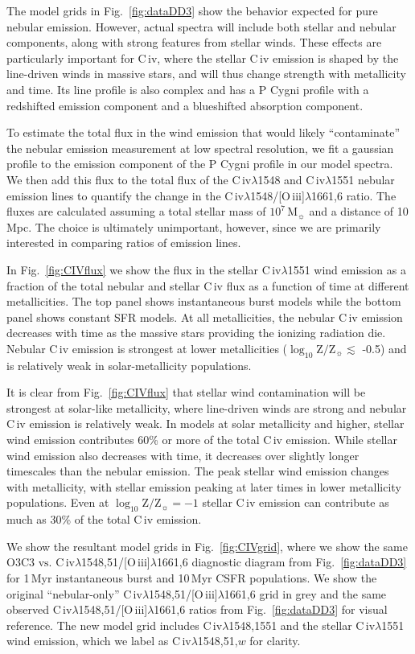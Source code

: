 \documentclass[preprint2,trackchanges]{aastex62}
\newcommand{\oiii}{[O\,{\sc iii}]\xspace}
\newcommand{\civ}{C\,{\sc iv}\xspace}
\newcommand\vs{\ensuremath{\mathrm{vs.}}\xspace}
\newcommand\Msun{\ensuremath{\mathrm{M_{\sun}}}\xspace}
\newcommand{\Myr}{$\,$Myr\xspace}
\newcommand{\logten}{\ensuremath{\log_{10}}}
\newcommand{\logz}{\ensuremath{\logten \mathrm{Z}/\mathrm{Z}_{\sun}}\xspace}
\newcommand{\logZeq}[1]{\ensuremath{\logten \mathrm{Z}/\mathrm{Z}_{\sun} = #1}}
\begin{document}
The model grids in Fig.~\ref{fig:dataDD3} show the behavior expected for pure nebular emission. However, actual spectra will include both stellar and nebular components, along with strong features from stellar winds. These effects are particularly important for \civ, where the stellar \civ emission is shaped by the line-driven winds in massive stars, and will thus change strength with metallicity and time. Its line profile is also complex and has a P Cygni profile with a redshifted emission component and a blueshifted absorption component.

To estimate the total flux in the wind emission that would likely ``contaminate'' the nebular emission measurement at low spectral resolution, we fit a gaussian profile to the emission component of the P Cygni profile in our model spectra. We then add this flux to the total flux of the \civ$\lambda$1548 and \civ$\lambda$1551 nebular emission lines to quantify the change in the  \civ$\lambda$1548/\oiii$\lambda$1661,6 ratio. The fluxes are calculated assuming a total stellar mass of $10^7\,$\Msun and a distance of 10\,Mpc. The choice is ultimately unimportant, however, since we are primarily interested in comparing ratios of emission lines.

In Fig.~\ref{fig:CIVflux} we show the flux in the stellar \civ$\lambda$1551 wind emission as a fraction of the total nebular and stellar \civ flux as a function of time at different metallicities. The top panel shows instantaneous burst models while the bottom panel shows constant SFR models. At all metallicities, the nebular \civ emission decreases with time as the massive stars providing the ionizing radiation die. Nebular \civ emission is strongest at lower metallicities (\logz $\lesssim$ -0.5) and is relatively weak in solar-metallicity populations. 

It is clear from Fig.~\ref{fig:CIVflux} that stellar wind contamination will be strongest at solar-like metallicity, where line-driven winds are strong and nebular \civ emission is relatively weak. In models at solar metallicity and higher, stellar wind emission contributes 60\% or more of the total \civ emission. While stellar wind emission also decreases with time, it decreases over slightly longer timescales than the nebular emission. The peak stellar wind emission changes with metallicity, with stellar emission peaking at later times in lower metallicity populations. Even at \logZeq{-1} stellar \civ emission can contribute as much as 30\% of the total \civ emission.

We show the resultant model grids in Fig.~\ref{fig:CIVgrid}, where we show the same O3C3 \vs \civ$\lambda$1548,51/\oiii$\lambda$1661,6 diagnostic diagram from Fig.~\ref{fig:dataDD3} for 1\Myr instantaneous burst and 10\Myr CSFR populations. We show the original ``nebular-only'' \civ$\lambda$1548,51/\oiii$\lambda$1661,6 grid in grey and the same observed \civ$\lambda$1548,51/\oiii$\lambda$1661,6 ratios from Fig.~\ref{fig:dataDD3} for visual reference. The new model grid includes \civ$\lambda$1548,1551 and the stellar \civ$\lambda$1551 wind emission, which we label as \civ$\lambda$1548,51,$w$ for clarity.
\end{document}
